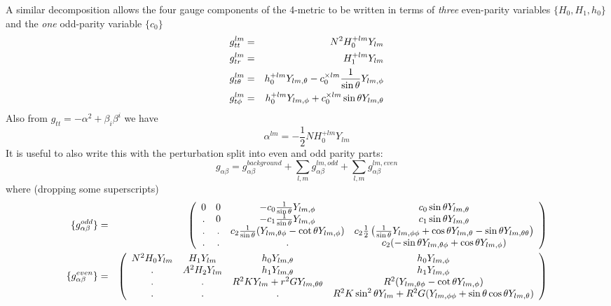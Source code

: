 \documentclass{article}
\begin{document}
%
A similar decomposition allows the four gauge components of the
4-metric to be written in terms of {\it three} even-parity variables
$\{H_0,H_1,h_0\}$ and the {\it one} odd-parity variable $\{c_0\}$
%
\begin{eqnarray}
  g_{tt}^{lm} & = & N^2 H_0^{+lm} Y_{lm} 
\\
  g_{tr}^{lm} & = & H_1^{+lm} Y_{lm}
\\
  g_{t\theta}^{lm} & = & h_0^{+lm} Y_{lm,\theta} - c_0^{\times lm}\frac{1}{\sin\theta}Y_{lm,\phi}
\\
  g_{t\phi}^{lm} & = & h_0^{+lm} Y_{lm,\phi} + c_0^{\times lm} \sin\theta Y_{lm,\theta}
\end{eqnarray} 
%        
Also from $g_{tt}=-\alpha^2+\beta_i\beta^i$ we have
%
\begin{equation}
  \alpha^{lm} = -\frac{1}{2}NH_0^{+lm}Y_{lm}
\end{equation}
%
It is useful to also write this with the perturbation split into even and
odd parity parts:
$$
g_{\alpha\beta} = {g}^{background}_{\alpha\beta} +
   \sum_{l,m} g^{lm,odd}_{\alpha\beta}
+\sum_{l,m} g^{lm,even}_{\alpha\beta}
$$
where (dropping some superscripts)
\begin{eqnarray*}
\{g_{\alpha\beta}^{odd}\}
&=&
\left( 
\begin{array}{cccc}
0 & 0 &  - c_0\frac{1}{\sin\theta}Y_{lm,\phi}
    & c_0 \sin\theta Y_{lm,\theta}
\\
. & 0 & - c_1\frac{1}{\sin\theta} Y_{lm,\phi}
  & c_1 \sin\theta Y_{lm,\theta}
\\
. & . & c_2\frac{1}{\sin\theta}(Y_{lm,\theta\phi}-\cot\theta Y_{lm,\phi})  
  & c_2\frac{1}{2} \left(\frac{1}{\sin\theta}
          Y_{lm,\phi\phi}+\cos\theta Y_{lm,\theta}-\sin\theta Y_{lm,\theta\theta}\right)
\\
.&.&.&c_2 (-\sin\theta Y_{lm,\theta\phi}+\cos\theta Y_{lm,\phi})
\end{array}
\right)
\\
\{g_{\alpha\beta}^{even}\}
&=&
\left( 
\begin{array}{cccc}
N^2 H_0Y_{lm} & H_1Y_{lm}       & h_0Y_{lm,\theta}          & h_0 Y_{lm,\phi}             \\ 
.       & A^2H_2Y_{lm} & h_1Y_{lm,\theta}          & h_1 Y_{lm,\phi}             \\
.       & .           & R^2KY_{lm}+r^2GY_{lm,\theta\theta} & R^2(Y_{lm,\theta\phi}-\cot\theta Y_{lm,\phi}) \\
.       & .           & .                & R^2 K\sin^2\theta Y_{lm}+R^2G(Y_{lm,\phi\phi}+\sin\theta\cos\theta Y_{lm,\theta})
\end{array}
\right)
\end{eqnarray*}
\end{document}
